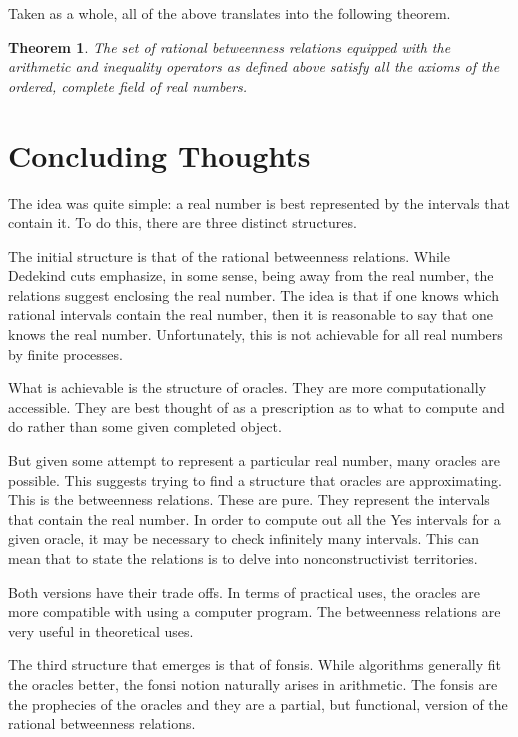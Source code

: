 \documentclass[12pt]{article}
\newtheorem{theorem}{Theorem}[section]
\begin{document}
Taken as a whole, all of the above translates into the following theorem.

\begin{theorem}
    The set of rational betweenness relations equipped with the arithmetic and inequality operators as defined above satisfy all the axioms of the ordered, complete field of real numbers. 
\end{theorem}


\section{Concluding Thoughts}

The idea was quite simple:  a real number is best represented by the intervals that contain it. To do this, there are three distinct structures. 

The initial structure is that of the rational betweenness relations. While Dedekind cuts emphasize, in some sense, being away from the real number, the relations suggest enclosing the real number. The idea is that if one knows which rational intervals contain the real number, then it is reasonable to say that one knows the real number. Unfortunately, this is not achievable for all real numbers by finite processes. 

What is achievable is the structure of oracles. They are more computationally accessible. They are best thought of as a prescription as to what to compute and do rather than some given completed object. 

But given some attempt to represent a particular real number, many oracles are possible. This suggests trying to find a structure that oracles are approximating. This is the betweenness relations. These are pure. They represent the intervals that contain the real number. In order to compute out all the Yes intervals for a given oracle, it may be necessary to check infinitely many intervals. This can mean that to state the relations is to delve into nonconstructivist territories. 

Both versions have their trade offs. In terms of practical uses, the oracles are more compatible with using  a computer program. The betweenness relations are very useful in theoretical uses. 

The third structure that emerges is that of fonsis. While algorithms generally fit the oracles better, the fonsi notion naturally arises in arithmetic. The fonsis are the prophecies of the oracles and they are a partial, but functional, version of the rational betweenness relations. 
\end{document}
